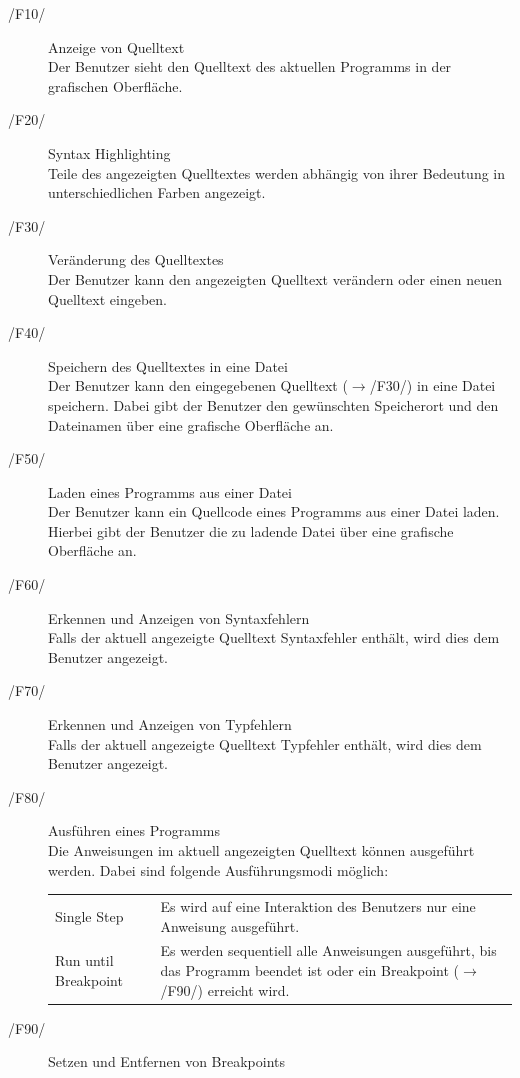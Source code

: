 \documentclass[a4paper,10pt]{article}
\begin{document}
\begin{description}
\item[/F10/] Anzeige von Quelltext\\
Der Benutzer sieht den Quelltext des aktuellen Programms in der grafischen Oberfläche.
\item[/F20/] Syntax Highlighting\\
Teile des angezeigten Quelltextes werden abhängig von ihrer Bedeutung in unterschiedlichen Farben angezeigt.
\item[/F30/] Veränderung des Quelltextes\\
Der Benutzer kann den angezeigten Quelltext verändern oder einen neuen Quelltext eingeben.
\item[/F40/] Speichern des Quelltextes in eine Datei\\
Der Benutzer kann den eingegebenen Quelltext ($\to$/F30/) in eine Datei speichern. Dabei gibt der Benutzer den gewünschten Speicherort und den Dateinamen über eine grafische Oberfläche an.
\item[/F50/] Laden eines Programms aus einer Datei\\
Der Benutzer kann ein Quellcode eines Programms aus einer Datei laden. Hierbei gibt der Benutzer die zu ladende Datei über eine grafische Oberfläche an.
\item[/F60/] Erkennen und Anzeigen von Syntaxfehlern\\
Falls der aktuell angezeigte Quelltext Syntaxfehler enthält, wird dies dem Benutzer angezeigt.
\item[/F70/] Erkennen und Anzeigen von Typfehlern\\
Falls der aktuell angezeigte Quelltext Typfehler enthält, wird dies dem Benutzer angezeigt.
\item[/F80/] Ausführen eines Programms\\
Die Anweisungen im aktuell angezeigten Quelltext können ausgeführt werden. Dabei sind folgende Ausführungsmodi möglich:\\
\begin{tabularx}{\textwidth}{lX}
\leftskip=4cm
Single Step & Es wird auf eine Interaktion des Benutzers nur eine Anweisung ausgeführt.\\
Run until Breakpoint & Es werden sequentiell alle Anweisungen ausgeführt, bis das Programm beendet ist oder ein Breakpoint ($\to$/F90/) erreicht wird.\\
\end{tabularx}
\item[/F90/] Setzen und Entfernen von Breakpoints\\

\end{description}
\end{document}
